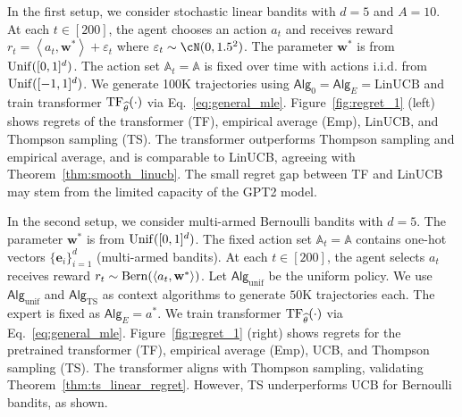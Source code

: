 \documentclass[10pt]{article}
\newcommand{\eps}{\varepsilon}
\newcommand{\<}{\left\langle}
\renewcommand{\>}{\right\rangle}
\newcommand{\TF}{{\rm TF}}
\newcommand{\LinUCB}{{\mathrm{LinUCB}}}
\newcommand{\TS}{{\mathrm{TS}}}
\newcommand{\action}{{a}}
\newcommand{\reward}{{r}}
\newcommand{\totlen}{{T}} %
\newcommand{\sAlg}{{\mathsf{Alg}}}
\newcommand{\EstPar}{{\widehat{\theta}}}
\newcommand{\shortexp}{{E}}
\def\sA{{\mathbb{A}}}
\def\be{{\mathbf e}}
\def\bw{{\mathbf w}}
\begin{document}
In the first setup, we consider stochastic linear bandits with $d=5$ and $A=10$. At each $t \in [200]$, the agent chooses an action $\action_t$ and receives reward $\reward_t=\<\action_t,\bw^*\>+\eps_t$ where $\eps_t\sim\cN(0,1.5^2)$. The parameter $\bw^*$ is from ${\rm Unif}([0,1]^d)$. The action set $\sA_t=\sA$ is fixed over time with actions i.i.d. from ${\rm Unif}([-1, 1]^d)$. We generate 100K trajectories using $\sAlg_0=\sAlg_{\shortexp}=\LinUCB$ and train transformer $\TF_\EstPar(\cdot)$ via Eq.~\eqref{eq:general_mle}. Figure~\ref{fig:regret_1} (left) shows regrets of the transformer (TF), empirical average (Emp), LinUCB, and Thompson sampling (TS). The transformer outperforms Thompson sampling and empirical average, and is comparable to LinUCB, agreeing with Theorem~\ref{thm:smooth_linucb}. The small regret gap between TF and LinUCB may stem from the limited capacity of the GPT2 model.




In the second setup, we consider multi-armed Bernoulli bandits with $d = 5$. The parameter $\bw^*$ is from ${\rm Unif}([0,1]^d)$. The fixed action set $\sA_t=\sA$ contains one-hot vectors $\{\be_i\}_{i=1}^d$ (multi-armed bandits). At each $t \in [200]$, the agent selects $\action_t$ receives reward $r_t \sim {\rm Bern}(\<\action_t,\bw^*\>)$. Let $\sAlg_{\mathrm{unif}}$ be the uniform policy. We use $\sAlg_{\mathrm{unif}}$ and $\sAlg_\TS$ as context algorithms to generate $50$K trajectories each. The expert is fixed as $\sAlg_\shortexp=\action^*$. We train transformer $\TF_\EstPar(\cdot)$ via Eq.~\eqref{eq:general_mle}. Figure~\ref{fig:regret_1} (right) shows regrets for the pretrained transformer (TF), empirical average (Emp), UCB, and Thompson sampling (TS).  The transformer aligns with Thompson sampling, validating Theorem~\ref{thm:ts_linear_regret}. However, TS underperforms UCB for Bernoulli bandits, as shown. 
\end{document}
